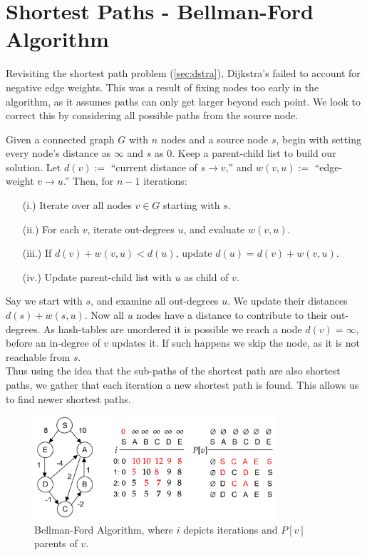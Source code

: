 \newpage 

\section{Shortest Paths - Bellman-Ford Algorithm}
Revisiting the shortest path problem (\ref{sec:dstra}), Dijkstra's failed to 
account for negative edge weights. This was a result of fixing nodes too early in the algorithm,
as it assumes paths can only get larger beyond each point. We look to correct this by considering all possible paths from the source node.
\begin{theo}

    \label{theo:bellman}
    Given a connected graph $G$ with $n$ nodes and a source node $s$, begin with setting 
    every node's distance as $\infty$ and $s$ as 0. Keep a parent-child list to build our solution. Let $d(v):=$ ``current distance of $s\to v$,'' and 
    $w(v,u):=$ ``edge-weight $v\to u$.'' Then, for $n-1$ iterations:
    \begin{enumerate}
        \item [(i.)] Iterate over all nodes $v\in G$ starting with $s$.
        \item [(ii.)] For each $v$, iterate out-degrees $u$, and evaluate $w(v,u)$.
        \item [(iii.)] If $d(v)+w(v,u)<d(u)$, update $d(u)=d(v)+w(v,u)$.
        \item [(iv.)] Update parent-child list with $u$ as child of $v$.
    \end{enumerate}
\end{theo}
\noindent
Say we start with $s$, and examine all out-degrees $u$. We update their distances $d(s)+w(s,u)$. Now all $u$ nodes 
have a distance to contribute to their out-degrees. As hash-tables are unordered it is possible we reach a node $d(v)=\infty$, 
before an in-degree of $v$ updates it. If such happens we skip the node, as it is not reachable from $s$.\\

\noindent
Thus using the idea that the sub-paths of the shortest path are also shortest paths, we gather that
each iteration a new shortest path is found. This allows us to find newer shortest paths.
\begin{figure}[h]
    \centering
    \includegraphics[width=0.8\textwidth]{Sections/dp/bford.png}
    \caption{Bellman-Ford Algorithm, where $i$ depicts iterations and $P[v]$ parents of $v$.}
    \label{fig:bford}
\end{figure}

